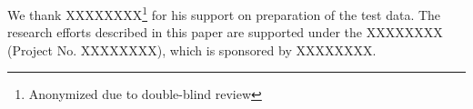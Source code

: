 We thank XXXXXXXX\footnote{Anonymized due to double-blind review} for his
support on preparation of the test data.  The research efforts described in
this paper are supported under the XXXXXXXX (Project No. XXXXXXXX), which is
sponsored by XXXXXXXX.

